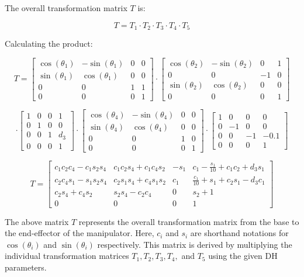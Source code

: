 \documentclass{article}
\begin{document}
The overall transformation matrix \( T \) is:

\[
T = T_1 \cdot T_2 \cdot T_3 \cdot T_4 \cdot T_5
\]

Calculating the product:

\[
T = \begin{bmatrix}
\cos(\theta_1) & -\sin(\theta_1) & 0 & 0 \\
\sin(\theta_1) & \cos(\theta_1) & 0 & 0 \\
0 & 0 & 1 & 1 \\
0 & 0 & 0 & 1
\end{bmatrix}
\cdot
\begin{bmatrix}
\cos(\theta_2) & -\sin(\theta_2) & 0 & 1 \\
0 & 0 & -1 & 0 \\
\sin(\theta_2) & \cos(\theta_2) & 0 & 0 \\
0 & 0 & 0 & 1
\end{bmatrix}
\]

\[
\cdot
\begin{bmatrix}
1 & 0 & 0 & 1 \\
0 & 1 & 0 & 0 \\
0 & 0 & 1 & d_3 \\
0 & 0 & 0 & 1
\end{bmatrix}
\cdot
\begin{bmatrix}
\cos(\theta_4) & -\sin(\theta_4) & 0 & 0 \\
\sin(\theta_4) & \cos(\theta_4)  & 0 & 0 \\
0 & 0 & 1 & 0 \\
0 & 0 & 0 & 1
\end{bmatrix}
\cdot
\begin{bmatrix}
1 & 0 & 0 & 0 \\
0 & -1  & 0 & 0 \\
0 & 0 & -1 & -0.1 \\
0 & 0 & 0 & 1
\end{bmatrix}
\]

\[
T = \begin{bmatrix}
c_1 c_2 c_4 - c_1 s_2 s_4 & c_1 c_2 s_4 + c_1 c_4 s_2 & -s_1 & c_1 - \frac{s_1}{10} + c_1 c_2 + d_3 s_1 \\
c_2 c_4 s_1 - s_1 s_2 s_4 & c_2 s_1 s_4 + c_4 s_1 s_2 & c_1 & \frac{c_1}{10} + s_1 + c_2 s_1 - d_3 c_1 \\
c_2 s_4 + c_4 s_2 & s_2 s_4 - c_2 c_4 & 0 & s_2 + 1 \\
0 & 0 & 0 & 1
\end{bmatrix}
\]

The above matrix \( T \) represents the overall transformation matrix from the base to the end-effector of the manipulator. Here, $c_i$ and $s_i$ are shorthand notations for $\cos(\theta_i)$  and  $\sin(\theta_i) $ respectively. This matrix is derived by multiplying the individual transformation matrices \( T_1, T_2, T_3, T_4, \) and \( T_5 \) using the given DH parameters.
\end{document}
